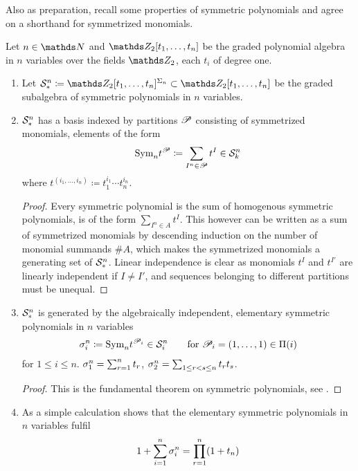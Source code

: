 Also as preparation, recall some properties of symmetric polynomials
and agree on a shorthand for symmetrized monomials.
\begin{LemDef}
  Let $n\in\Nat$ and $\Zmod2[t_1,\dotsc,t_n]$ be the graded polynomial
  algebra in $n$ variables over the fields $\Zmod2$, each $t_i$ of
  degree one.
  \begin{enumerate}
  \item Let
    $\Symm{n}_*
    \coloneqq \Zmod2[t_1,\dotsc,t_n]^{\Permutations{n}}
    \subset \Zmod2[t_1,\dotsc,t_n]$
    be the graded subalgebra of symmetric polynomials in $n$ variables.
  \item $\mathcal{S}^{n}_*$ has a basis indexed by partitions $\mathscr{P}$
    consisting of symmetrized monomials, \idest elements of the form
    \begin{gather*}
      \text{\normalfont Sym}_{n} t^{\mathscr{P}} \coloneqq \sum_{I^n\in\mathscr{P}} t^I \in \mathcal{S}^{n}_k
    \end{gather*}
    where $t^{(i_1,\dotsc,i_n)}\coloneqq t_1^{i_1}\dotsm t_n^{i_n}$.
    \begin{proof}
      Every symmetric polynomial is the sum of homogenous symmetric
      polynomials, \idest is of the form $\sum_{I^n\in A}t^I$. This
      however can be written as a sum of symmetrized monomials by
      descending induction on the number of monomial summands $\#A$,
      which makes the symmetrized monomials a generating set of $\mathcal{S}^{n}_*$.
      Linear independence is clear as monomials $t^I$ and $t^{I'}$ are
      linearly independent if $I\neq I'$, and sequences belonging to
      different partitions must be unequal.
    \end{proof}
  \item $\mathcal{S}^{n}_*$ is generated by the algebraically independent,
    elementary symmetric polynomials in $n$ variables
    \begin{gather*}
      \sigma_{i}^{n}\coloneqq \text{\normalfont Sym}_{n} t^{\mathscr{P}_i}
      \in \mathcal{S}^{n}_i
      \qquad \text{for }
      \mathscr{P}_i = (1,\dotsc,1)
      \in \Pi({i})
    \end{gather*}
    for $1\leq i\leq n$.
    \Forexample
    $\sigma_{1}^{n}=\sum_{r=1}^{n}t_r$,
    $\sigma_{2}^{n}=\sum_{1\leq r<s\leq n} t_r t_s$.
    \begin{proof}
      This is the fundamental theorem on symmetric polynomials,
      see \forexample \cite[Chapter~4.4, Satz~1]{bosch2013algebra}.
    \end{proof}
  \item As a simple calculation shows that the elementary symmetric
    polynomials in $n$ variables fulfil
    \begin{gather}\label{eq:sumelemsymmpoly}
      1 + \sum_{i=1}^{n} \sigma_{i}^{n}
      = \prod_{r=1}^{n}(1+t_n)
    \end{gather}
  \end{enumerate}
\end{LemDef}

